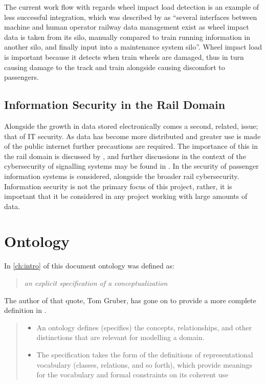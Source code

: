 The current work flow with regards wheel impact load detection is an example of less successful integration, which was described by \citet{Tutcher2015} as  ``several interfaces between machine and human operator railway data management exist as wheel impact data is taken from its silo, manually compared to train running information in another silo, and finally input into a maintenance system silo''. Wheel impact load is important because it detects when train wheels are damaged, thus in turn causing damage to the track and train alongside causing discomfort to passengers.

\subsection{Information Security in the Rail Domain}

Alongside the growth in data stored electronically comes a second, related, issue; that of IT security. As data has become more distributed and greater use is made of the public internet further precautions are required. The importance of this in the rail domain is discussed by \citet{Depar2016}, and further discussions in the context of the cybersecurity of signalling systems may be found in \citet{BloomField2016}. In \citet{Chen2015} the security of passenger information systems is considered, alongside the broader rail cybersecurity. Information security is not the primary focus of this project, rather, it is important that it be considered in any project working with large amounts of data.

\section{Ontology}\label{onto}
In \autoref{ch:intro} of this document ontology was defined as: 
\begin{quote}
\emph{an explicit specification of a conceptualization}
\end{quote}
The author of that quote, Tom Gruber, has gone on to provide a more complete definition in \citep{Gru09}. 

\begin{quote}
\begin{itemize}
\item An ontology defines (specifies) the concepts, relationships, and other distinctions that are relevant for modelling a domain.
\item The specification takes the form of the definitions of representational vocabulary (classes, relations, and so forth), which provide meanings for the vocabulary and formal constraints on its coherent use
\end{itemize}
\end{quote}

